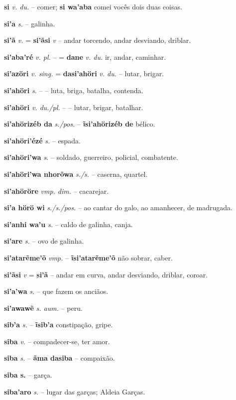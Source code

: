 \textbf{si} \textit{v. du.} -- comer; \textbf{si wa'aba} comei vocês dois duas coisas.

\textbf{si'a} \textit{s.} -- galinha.

\textbf{si'ã} \textit{v.} = \textbf{si'ãsi} \textit{v} -- andar torcendo, andar desviando, driblar.

\textbf{si'aba'ré} \textit{v. pl.} -- = \textbf{dane} \textit{v. du.} ir, andar, caminhar.

\textbf{si'azöri} \textit{v. sing.} = \textbf{dasi'ahöri} \textit{v. du.} -- lutar, brigar.

\textbf{si'ahöri} \textit{s.} -- -- luta, briga, batalha, contenda.

\textbf{si'ahöri} \textit{v. du./pl.} -- -- lutar, brigar, batalhar.

\textbf{si'ahörizéb da} \textit{s./pos.} -- \textbf{ĩsi'ahörizéb de} bélico.

\textbf{si'ahöri'ézé} \textit{s.} -- espada.

\textbf{si'ahöri'wa} \textit{s.} -- soldado, guerreiro, policial, combatente.

\textbf{si'ahöri'wa nhorõwa} \textit{s./s.} -- caserna, quartel.

\textbf{si'ahöröre} \textit{vmp. dim.} -- cacarejar.

\textbf{si'a hörö wi} \textit{s./s./pos.} -- ao cantar do galo, ao amanhecer, de madrugada.

\textbf{si'anhi wa'u} \textit{s.} -- caldo de galinha, canja.

\textbf{si'are} \textit{s.} -- ovo de galinha.

\textbf{si'atarẽme'õ} \textit{vmp.} -- \textbf{ĩsi'atarẽme'õ} não sobrar, caber.

\textbf{si'ãsi} \textit{v} = \textbf{si'ã} -- andar em curva, andar desviando, driblar, coroar.

\textbf{si'a'wa} \textit{s.} -- que fazem os anciãos.

\textbf{si'awawẽ} \textit{s. aum.} -- peru.

\textbf{sib'a} \textit{s.} -- \textbf{ĩsib'a} constipação, gripe.

\textbf{siba} \textit{v.} -- compadecer-se, ter amor.

\textbf{siba} \textit{s.} -- \textbf{ãma dasiba} -- compaixão.

\textbf{siba s.} -- garça.

\textbf{siba'aro} \textit{s.} -- lugar das garças; Aldeia Garças.


